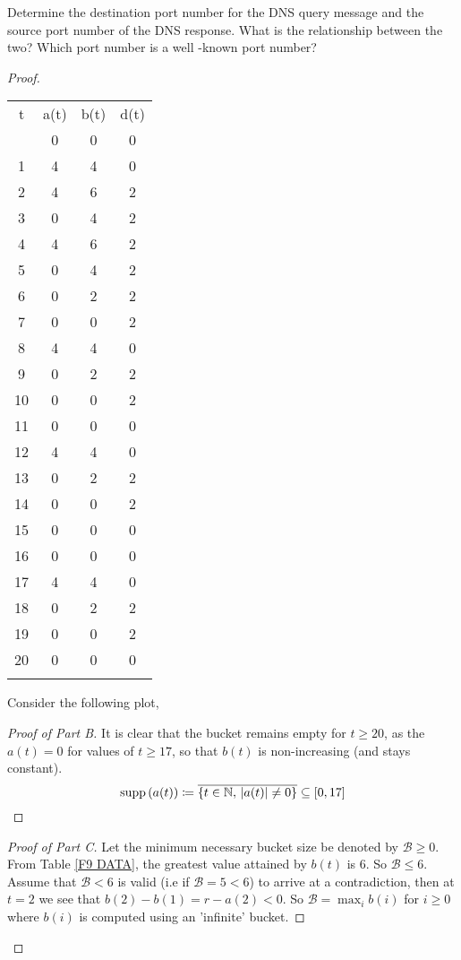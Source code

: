 \documentclass[../../main.tex]{subfiles}
\begin{document}
\providecommand{\buck}{\mathcal{B}}
\providecommand{\queue}{\mathcal{Q}}
\providecommand{\probnum}{F10}
\begin{wts}
Determine the destination port number for the DNS query message and the source port number of the DNS response.  What is the relationship between the two? Which port number is a well -known port number?
\end{wts}
\begin{proof}
\begin{center}
    \begin{tabularx}{\textwidth}{cccc}
    \cmidrule[0.75pt](r){1-4}\addlinespace[0.2em]
    t&a(t)&b(t)&d(t)\tabularnewline \cmidrule[0.5pt](r){1-4}\addlinespace[0.2em]
    0&0&0&0\tabularnewline
    1&4&4&0\tabularnewline
    2&4&6&2\tabularnewline
    3&0&4&2\tabularnewline
    4&4&6&2\tabularnewline
    5&0&4&2\tabularnewline
    6&0&2&2\tabularnewline
    7&0&0&2\tabularnewline
    8&4&4&0\tabularnewline
    9&0&2&2\tabularnewline
    10&0&0&2\tabularnewline
    11&0&0&0\tabularnewline
    12&4&4&0\tabularnewline
    13&0&2&2\tabularnewline
    14&0&0&2\tabularnewline
    15&0&0&0\tabularnewline
    16&0&0&0\tabularnewline
    17&4&4&0\tabularnewline
    18&0&2&2\tabularnewline
    19&0&0&2\tabularnewline
    20&0&0&0\tabularnewline
    
    \cmidrule[0.75pt](r){1-4}\addlinespace[0.2em]
    \end{tabularx}\label{F9 DATA}
\end{center}
Consider the following plot,\\

\begin{proof}[Proof of Part B]
    It is clear that the bucket remains empty for $t\geq 20$, as the $a(t)=0$ for values of $t\geq 17$, so that $b(t)$ is non-increasing (and stays constant). \[\operatorname{supp}{(a(t))}\coloneqq\overline{\{t\in\mathbb{N},\,|a(t)|\neq 0\}}\subseteq[0,17]\]
\end{proof}
\begin{proof}[Proof of Part C]
    Let the minimum necessary bucket size be denoted by $\buck\geq 0$. From Table \ref{F9 DATA}, the greatest value attained by $b(t)$ is $6$. So $\buck \leq 6$. Assume that $\buck < 6$ is valid (i.e if $\buck = 5<6$) to arrive at a contradiction, then at $t=2$ we see that $b(2)-b(1)=r-a(2)<0$. So $\buck = \max_i b(i)$ for $i\geq 0$ where $b(i)$ is computed using an 'infinite' bucket.
\end{proof}
\end{proof}
\end{document}

